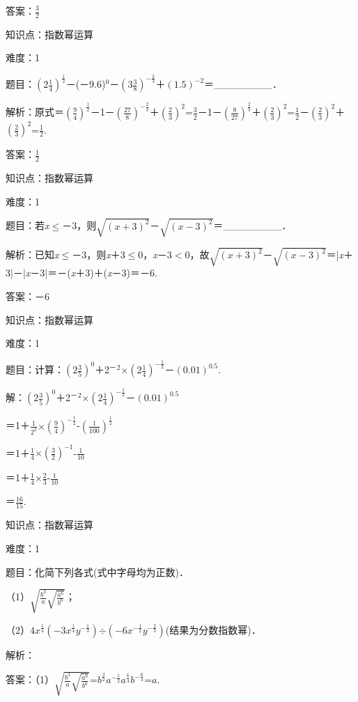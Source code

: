 \documentclass{article} %
\begin{document}
答案：$\frac{3}{2}$

知识点：指数幂运算

难度：1

题目：$(2\frac{1}{4})^{\frac{1}{2}}$－(－9.6)${}^{0}$－$(3\frac{3}{8})^{-\frac{2}{3}}$＋$(1.5)^{-2}$＝\_\_\_\_\_\_\_\_．

解析：原式＝$(\frac{9}{4})^{\frac{1}{2}}$－1－$(\frac{27}{8})^{-\frac{2}{3}}$＋$(\frac{2}{3})^{2}$=$\frac{3}{2}$－1－$(\frac{8}{27})^{\frac{2}{3}}$＋$(\frac{2}{3})^{2}$=$\frac{1}{2}$－$(\frac{2}{3})^{2}$＋$(\frac{2}{3})^{2}$=$\frac{1}{2}$.

答案：$\frac{1}{2}$

知识点：指数幂运算

难度：1

题目：若\textit{x}$\mathrm{\le}$－3，则$\sqrt{(x+3)^{2}}$－$\sqrt{(x-3)^{2}}$＝\_\_\_\_\_\_\_\_．

解析：已知\textit{x}$\mathrm{\le}$－3，则\textit{x}＋3$\mathrm{\le}$0，\textit{x}－3$\mathrm{<}$0，故$\sqrt{(x+3)^{2}}$－$\sqrt{(x-3)^{2}}$＝|\textit{x}＋3|－|\textit{x}－3|＝－(\textit{x}＋3)＋(\textit{x}－3)＝－6.

答案：－6

知识点：指数幂运算

难度：1

题目：计算：$(2\frac{3}{5})^{0}$＋2${}^{\textrm{－}}$${}^{2}$$\mathrm{\times}$$(2\frac{1}{4})^{-\frac{1}{2}}$－$(0.01)^{0.5}$.

解：$(2\frac{3}{5})^{0}$＋2${}^{\textrm{－}}$${}^{2}$$\mathrm{\times}$$(2\frac{1}{4})^{-\frac{1}{2}}$－$(0.01)^{0.5}$

＝1＋$\frac{1}{2^{2}}$$\mathrm{\times}$$(\frac{9}{4})^{-\frac{1}{2}}$-$(\frac{1}{100})^{\frac{1}{2}}$

＝1＋$\frac{1}{4}$$\mathrm{\times}$$(\frac{3}{2})^{-1}$-$\frac{1}{10}$

＝1＋$\frac{1}{4}$$\mathrm{\times}$$\frac{2}{3}$-$\frac{1}{10}$

＝$\frac{16}{15}$.

知识点：指数幂运算

难度：1

题目：化简下列各式(式中字母均为正数)．

（1）$\sqrt{\frac{b^{3}}{a}\sqrt{\frac{a^{6}}{b^{6}}}}$；

（2）$4x^{\frac{1}{4}}(-3x^{\frac{1}{4}}y^{-\frac{1}{3}})$$\div$$(-6x^{-\frac{1}{2}}y^{-\frac{2}{3}})$(结果为分数指数幂)．

解析：

答案：（1）$\sqrt{\frac{b^{3}}{a}\sqrt{\frac{a^{6}}{b^{6}}}}$=$b^{\frac{3}{2}}a^{-\frac{1}{2}}a^{\frac{6}{4}}b^{-\frac{6}{4}}$=$a$.
\end{document}
